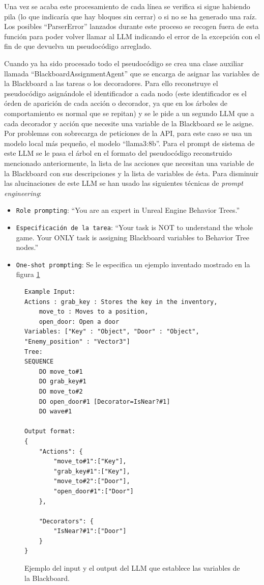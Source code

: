 Una vez se acaba este procesamiento de cada línea se verifica si sigue habiendo pila (lo que indicaría que hay bloques sin cerrar) o si no se ha generado una raíz.
Los posibles ``ParserError'' lanzados durante este proceso se recogen fuera de esta función para poder volver llamar al LLM indicando el error de la excepción con el fin de que devuelva un pseudocódigo arreglado.

Cuando ya ha sido procesado todo el pseudocódigo se crea una clase auxiliar llamada ``BlackboardAssignmentAgent'' que se encarga de asignar las variables de la Blackboard a las tareas o los decoradores.
Para ello reconstruye el pseudocódigo asignándole el identificador a cada nodo (este identificador es el órden de aparición de cada acción o decorador, ya que en los árboles de comportamiento es normal que se repitan) y se le pide a un segundo LLM que a cada decorador y acción que necesite una variable de la Blackboard se le asigne.
Por problemas con sobrecarga de peticiones de la API, para este caso se usa un modelo local más pequeño, el modelo ``llama3:8b''.
Para el prompt de sistema de este LLM se le pasa el árbol en el formato del pseudocódigo reconstruido mencionado anteriormente, la lista de las acciones que necesitan una variable de la Blackboard con sus descripciones y la lista de variables de ésta.
Para disminuir las alucinaciones de este LLM se han usado las siguientes técnicas de \textit{prompt engineering}:

\begin{itemize}
    \item \texttt{Role prompting}: ``You are an expert in Unreal Engine Behavior Trees.''
    \item \texttt{Especificación de la tarea}: ``Your task is NOT to understand the whole game. Your ONLY task is assigning Blackboard variables to Behavior Tree nodes.''
    \item \texttt{One-shot prompting}: Se le especifica un ejemplo inventado mostrado en la figura \ref{fig:examplePseudocodeBB}
\end{itemize}

\begin{figure}[htbp]
  \begin{verbatim}
Example Input:
Actions : grab_key : Stores the key in the inventory,
    move_to : Moves to a position,
    open_door: Open a door
Variables: ["Key" : "Object", "Door" : "Object", "Enemy_position" : "Vector3"]
Tree:
SEQUENCE
    DO move_to#1
    DO grab_key#1
    DO move_to#2
    DO open_door#1 [Decorator=IsNear?#1]
    DO wave#1

Output format: 
{
    "Actions": {
        "move_to#1":["Key"],
        "grab_key#1":["Key"],
        "move_to#2":["Door"],
        "open_door#1":["Door"]
    },

    "Decorators": {
        "IsNear?#1":["Door"]
    }
}
\end{verbatim}
  \caption{Ejemplo del input y el output del LLM que establece las variables de la Blackboard.}
  \label{fig:examplePseudocodeBB}
\end{figure}


